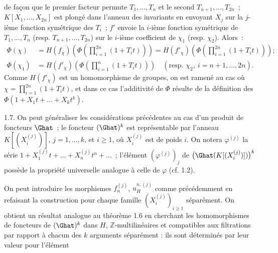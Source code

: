
de façon que le
premier facteur permute \(T_1,\ldots,T_n\) et le second \(T_{n+1},\ldots,T_{2n}\)~; \(K[X_1,\ldots,X_{2n}]\) est plongé dans l'anneau des invariants en envoyant \(X_j\) sur la \(j\)-ième fonction symétrique des \(T_i\)~; \(f'\) envoie la \(i\)-ième fonction symétrique de \(T_1,\ldots,T_n\) (resp. \(T_{n+1},\ldots,T_{2n}\)) sur le \(i\)-ième coefficient de \(\chi_1\) (resp. \(\chi_2\)). Alors~:
\[
\begin{aligned}
\Phi(\chi)
&=H(f_\chi)\left(\Phi\left(\prod_{i=1}^{2n}(1+T_it)\right)\right)
=H(f'_\chi)\left(\Phi\left(\prod_{i=1}^{2n}(1+T_it)\right)\right);\\
\Phi(\chi_1) &=H(f'_\chi)\left(\Phi\left(\prod_{i=1}^{n}(1+T_it)\right)\right)\quad(\text{resp. }\chi_2,\ i=n+1,\ldots,2n).
\end{aligned}
\]
Comme \(H(f'_\chi)\) est un homomorphisme de groupes, on est ramené au cas où \(\chi=\prod_{i=1}^{2n}(1+T_it)\), et dans ce cas l'additivité de \(\Phi\) résulte de la définition des \(\Phi(1+X_1t+\ldots+X_k t^k)\).

1.7. On peut généraliser les considérations précédentes au cas d'un produit de foncteurs \(\Ghat\)~; le foncteur \((\Ghat)^k\) est représentable par l'anneau
\(K[(X_i^{(j)})]\), \(j=1,\ldots,k\), et \(i\geq 1\), où \(X_i^{(j)}\) est de poids \(i\). On notera \(\varphi^{(j)}\) la série \(1+X_1^{(j)}t+\ldots+X_n^{(j)}t^n+\ldots\)~; l'élément \((\varphi^{(j)})_j\) de \(\bigl(\Ghat(K[(X_i^{(j)})])\bigr)^k\) possède la propriété universelle analogue à celle de \(\varphi\) (cf. 1.2).

On peut introduire les morphismes \(f_n^{(j)}\), \(u_H^{n,(j)}\) comme précédemment en refaisant la construction pour chaque famille \((X_i^{(j)})_{i\geq 1}\) séparément. On obtient un résultat analogue au théorème 1.6 en cherchant les homomorphismes de foncteurs de \((\Ghat)^k\) dans \(H\), \(\mathbb Z\)-multilinéaires et compatibles aux filtrations par rapport à chacun des \(k\) arguments séparément : ils sont déterminés par leur valeur pour l'élément
